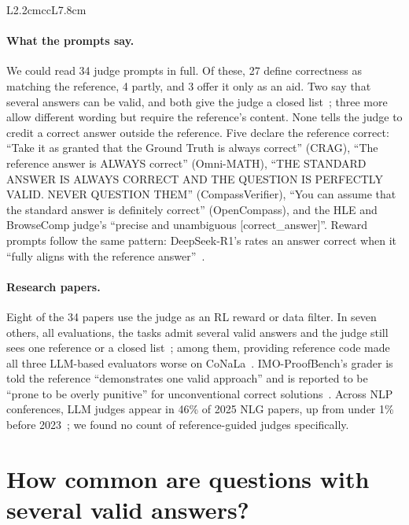 \begin{table}[htbp]
\begin{tabular}{L{2.2cm}ccL{7.8cm}}
\bottomrule
\end{tabular}
\end{table}

\paragraph{What the prompts say.} We could read 34 judge prompts in full. Of these, 27 define correctness as matching the reference, 4 partly, and 3 offer it only as an aid. Two say that several answers can be valid, and both give the judge a closed list~\citep{ni2024mixeval,vu2023freshllms}; three more allow different wording but require the reference's content. None tells the judge to credit a correct answer outside the reference. Five declare the reference correct: ``Take it as granted that the Ground Truth is always correct'' (CRAG), ``The reference answer is ALWAYS correct'' (Omni-MATH), ``THE STANDARD ANSWER IS ALWAYS CORRECT AND THE QUESTION IS PERFECTLY VALID. NEVER QUESTION THEM'' (CompassVerifier), ``You can assume that the standard answer is definitely correct'' (OpenCompass), and the HLE and BrowseComp judge's ``precise and unambiguous [correct\_answer]''. Reward prompts follow the same pattern: DeepSeek-R1's rates an answer correct when it ``fully aligns with the reference answer''~\citep{deepseek2025r1}.

\paragraph{Research papers.} Eight of the 34 papers use the judge as an RL reward or data filter. In seven others, all evaluations, the tasks admit several valid answers and the judge still sees one reference or a closed list~\citep{kamalloo2023evaluating,wang2023evouna,zheng2025deepresearcher,du2025deepresearchbench,zhuo2024icescore,tong2024codejudge,petrov2025proofbluff}; among them, providing reference code made all three LLM-based evaluators worse on CoNaLa~\citep{tong2024codejudge}. IMO-ProofBench's grader is told the reference ``demonstrates one valid approach'' and is reported to be ``prone to be overly punitive'' for unconventional correct solutions~\citep{luong2025imobench}. Across NLP conferences, LLM judges appear in 46\% of 2025 NLG papers, up from under 1\% before 2023~\citep{yang2026nlgmeta}; we found no count of reference-guided judges specifically.

\FloatBarrier
\section{How common are questions with several valid answers?}
\label{app:prevalence}

